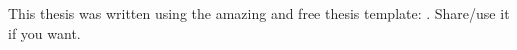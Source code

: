 \pagebreak

\vspace*{\fill}

\noindent This thesis was written using the amazing and free thesis template:
\tesischidisima.  Share/use it if you want. 

\pagebreak

